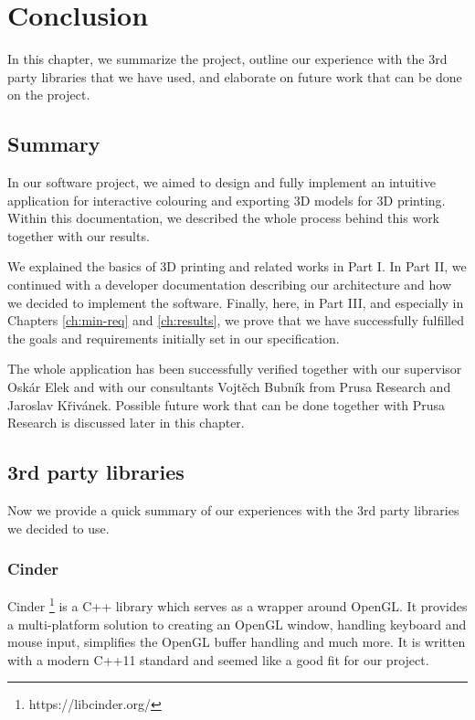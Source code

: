 \chapter{Conclusion}

In this chapter, we summarize the project, outline our experience with the 3rd party libraries that we have used, and elaborate on future work that can be done on the project.

\section{Summary}

In our software project, we aimed to design and fully implement an intuitive application for interactive colouring and exporting 3D models for 3D printing.
Within this documentation, we described the whole process behind this work together with our results.

We explained the basics of 3D printing and related works in Part I.
In Part II, we continued with a developer documentation describing our architecture and how we decided to implement the software.
Finally, here, in Part III, and especially in Chapters \ref{ch:min-req} and \ref{ch:results}, we prove that we have successfully fulfilled the goals and requirements initially set in our specification.

The whole application has been successfully verified together with our supervisor Oskár Elek and with our consultants Vojtěch Bubník from Prusa Research and Jaroslav Křivánek.
Possible future work that can be done together with Prusa Research is discussed later in this chapter.

\section{3rd party libraries}

Now we provide a quick summary of our experiences with the 3rd party libraries we decided to use.

\subsection{Cinder}

Cinder \footnote{https://libcinder.org/} is a C++ library which serves as a wrapper around OpenGL. It provides a multi-platform solution to creating an OpenGL window, handling keyboard and mouse input, simplifies the OpenGL buffer handling and much more. It is written with a modern C++11 standard and seemed like a good fit for our project.

